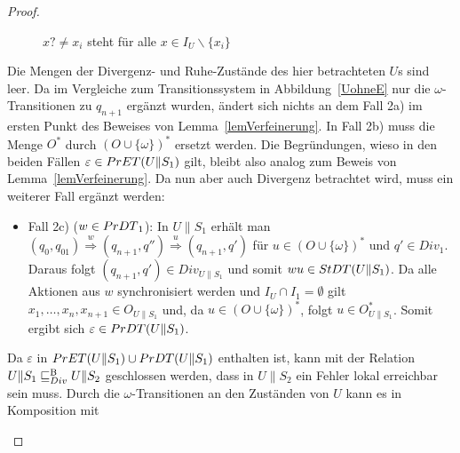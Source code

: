\begin{proof}
\begin{itemize}
\begin{figure} [h!tbp]
\begin{center}
        \caption{$x?\neq x_i$ steht für alle $x\in I_U\backslash\{x_i\}$}
\label{UohneEmitO}
      \end{center}
      \end{figure}
      Die Mengen der Divergenz- und Ruhe-Zustände des hier betrachteten $U$s
      sind leer. Da im Vergleiche zum Transitionssystem in
      Abbildung~\ref{UohneE} nur die $\omega$-Transitionen zu $q_{n+1}$ ergänzt
      wurden, ändert sich nichts an dem Fall 2a) im ersten Punkt des Beweises
      von Lemma~\ref{lemVerfeinerung}. In Fall 2b) muss die Menge
      $O^*$ durch $(O\cup \{\omega\})^*$ ersetzt werden. Die Begründungen,
      wieso in den beiden Fällen $\varepsilon\in PrET{}(U\|S_1)$ gilt, bleibt
      also analog zum Beweis von Lemma~\ref{lemVerfeinerung}. Da nun aber auch
      Divergenz betrachtet wird, muss ein weiterer Fall ergänzt werden:
      \begin{itemize}
        \item Fall 2c) ($w\in PrDT{}_1$): In $U\|S_1$ erhält man $(q_0,q_{01})
          \overset{w}{\Rightarrow} (q_{n+1},q'') \overset{u}{\Rightarrow}
          (q_{n+1},q')$ für $u\in (O\cup \{\omega\})^*$ und $q'\in Div_1$.
          Daraus folgt $(q_{n+1},q')\in Div_{U\|S_1}$ und somit $wu\in
          StDT{}(U\|S_1)$. Da alle Aktionen aus $w$ synchronisiert werden und
          $I_U\cap I_1 = \emptyset$ gilt
          $x_1,\dots ,x_n,x_{n+1}\in O_{U\|S_1}$ und, da $u\in (O\cup
          \{\omega\})^*$, folgt $u\in O_{U\|S_1}^*$. Somit ergibt sich
          $\varepsilon\in PrDT{}(U\|S_1)$.
      \end{itemize}
      Da $\varepsilon$ in $PrET{}(U\|S_1)\cup PrDT{}(U\|S_1)$ enthalten
      ist, kann mit der Relation $U\|S_1\sqsubseteq _{Div}^\mathrm{B} U\|S_2$ geschlossen werden, dass
      in $U\|S_2$ ein Fehler lokal erreichbar sein muss. Durch die
      $\omega$-Transitionen an den Zuständen von $U$ kann es in Komposition mit

\end{itemize}
\end{proof}
